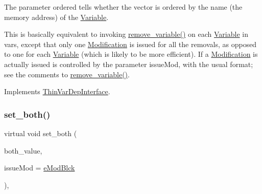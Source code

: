 The parameter ordered tells whether the vector is ordered by the name (the memory address) of the \mbox{\hyperlink{class_s_m_spp__di__unipi__it_1_1_variable}{Variable}}.

This is basically equivalent to invoking \mbox{\hyperlink{class_s_m_spp__di__unipi__it_1_1_f_row_constraint_ade52d9ebf47de895377b860ef4d3a607}{remove\+\_\+variable()}} on each \mbox{\hyperlink{class_s_m_spp__di__unipi__it_1_1_variable}{Variable}} in vars, except that only one \mbox{\hyperlink{class_s_m_spp__di__unipi__it_1_1_modification}{Modification}} is issued for all the removals, as opposed to one for each \mbox{\hyperlink{class_s_m_spp__di__unipi__it_1_1_variable}{Variable}} (which is likely to be more efficient). If a \mbox{\hyperlink{class_s_m_spp__di__unipi__it_1_1_modification}{Modification}} is actually issued is controlled by the parameter issue\+Mod, with the usual format; see the comments to \mbox{\hyperlink{class_s_m_spp__di__unipi__it_1_1_f_row_constraint_ade52d9ebf47de895377b860ef4d3a607}{remove\+\_\+variable()}}. 

Implements \mbox{\hyperlink{group___thin_var_dep_interface___c_l_a_s_s_e_s_ga4f21d262d25ed93ccc289134f2618ba9}{Thin\+Var\+Dep\+Interface}}.

\mbox{\label{class_s_m_spp__di__unipi__it_1_1_f_row_constraint_a6f44fbb5f6b5aebd5f78d7593dc6e000}} 
\subsubsection{\texorpdfstring{set\+\_\+both()}{set\_both()}}
{\footnotesize\ttfamily virtual void set\+\_\+both (\begin{DoxyParamCaption}\item[{\mbox{\hyperlink{class_s_m_spp__di__unipi__it_1_1_row_constraint_a34abd4b01d3a2024be5f6d13dd88779f}{c\+\_\+\+R\+H\+S\+Value}}}]{both\+\_\+value,  }\item[{\mbox{\hyperlink{group___modification___t_y_p_e_s_ga544246d8c462e9a2d817c2c30797968f}{c\+\_\+\+Mod\+Param}}}]{issue\+Mod = {\ttfamily \mbox{\hyperlink{group___modification___t_y_p_e_s_gga48fddcdd03a03f49b7e389ca1ed938d4a21b14b26b1c0093a0905f6fc010bad29}{e\+Mod\+Blck}}} }\end{DoxyParamCaption})\hspace{0.3cm}{\ttfamily [override]}, {\ttfamily [virtual]}}



